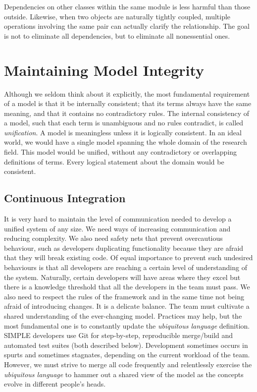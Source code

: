 \documentclass[a4paper,11pt]{article}
\begin{document}
Dependencies on other classes within the same module is less harmful than those outside. Likewise, when two objects are naturally tightly coupled, multiple operations involving the same pair can actually clarify the relationship. The goal is not to eliminate all dependencies, but to eliminate all nonessential ones.

\section{Maintaining Model Integrity}
Although we seldom think about it explicitly, the most fundamental requirement of a model is that it be internally consistent; that its terms always have the same meaning, and that it contains no contradictory rules. The internal consistency of a model, such that each term is unambiguous and no rules contradict, is called \textit{unification}. A model is meaningless unless it is logically consistent. In an ideal world, we would have a single model spanning the whole domain of the research field. This model would be unified, without any contradictory or overlapping definitions of terms. Every logical statement about the domain would be consistent. 

\subsection{Continuous Integration}
It is very hard to maintain the level of communication needed to develop a unified system of any size. We need ways of increasing communication and reducing complexity. We also need safety nets that prevent overcautious behaviour, such as developers duplicating functionality because they are afraid that they will break existing code. Of equal importance to prevent such undesired behaviours is that all developers are reaching a certain level of understanding of the system. Naturally, certain developers will have areas where they excel but there is a knowledge threshold that all the developers in the team must pass. We also need to respect the rules of the framework and in the same time not being afraid of introducing changes. It is a delicate balance. The team must cultivate a shared understanding of the ever-changing model. Practices may help, but the most fundamental one is to constantly update the \textit{ubiquitous language} definition. SIMPLE developers use Git for step-by-step, reproducible merge/build and automated test suites (both described below). Development sometimes occurs in spurts and sometimes stagnates, depending on the current workload of the team. However, we must strive to merge all code frequently and relentlessly exercise the  \textit{ubiquitous language} to hammer out a shared view of the model as the concepts evolve in different people's heads.
\end{document}
